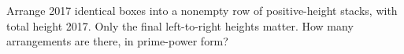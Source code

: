 Arrange 2017 identical boxes into a nonempty row of positive-height stacks, with total height 2017. Only the final left-to-right heights matter. How many arrangements are there, in prime-power form?
